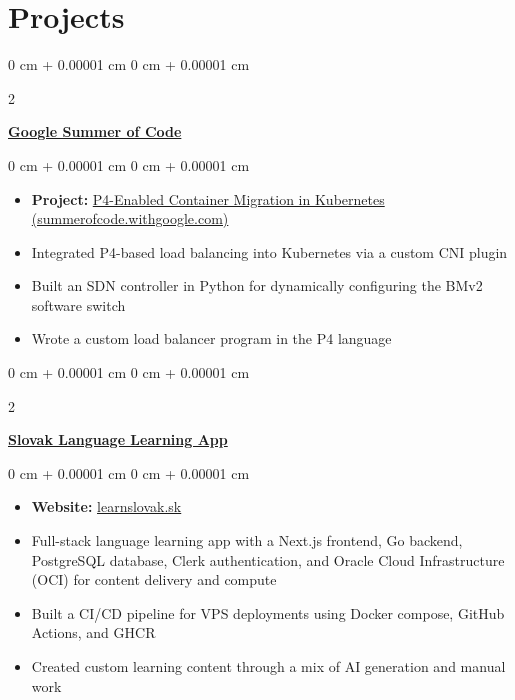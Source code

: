 \documentclass[10pt, letterpaper]{article}
\newenvironment{highlights}{
    \begin{itemize}[
        topsep=0.10 cm,
        parsep=0.10 cm,
        partopsep=0pt,
        itemsep=0pt,
        leftmargin=0 cm + 10pt
    ]
}{
    \end{itemize}
} %
\newenvironment{onecolentry}{
    \begin{adjustwidth}{
        0 cm + 0.00001 cm
    }{
        0 cm + 0.00001 cm
    }
}{
    \end{adjustwidth}
} %
\newenvironment{twocolentry}[2][]{
    \onecolentry
    \def\secondColumn{#2}
    \setcolumnwidth{\fill, 4.5 cm}
    \begin{paracol}{2}
}{
    \switchcolumn \raggedleft \secondColumn
    \end{paracol}
    \endonecolentry
} %
\begin{document}
    \section{Projects}

        \begin{twocolentry}{

        }
            \href{https://summerofcode.withgoogle.com/archive/2024/projects/sYbpOJhD}{\textbf{Google Summer of Code}}\end{twocolentry}

        \vspace{0.10 cm}
        \begin{onecolentry}
            \begin{highlights}
                \item \textbf{Project:} \href{https://summerofcode.withgoogle.com/archive/2024/projects/sYbpOJhD}{P4-Enabled Container Migration in Kubernetes (summerofcode.withgoogle.com)}
                \item Integrated P4-based load balancing into Kubernetes via a custom CNI plugin
                \item Built an SDN controller in Python for dynamically configuring the BMv2 software switch
                \item Wrote a custom load balancer program in the P4 language
            \end{highlights}
        \end{onecolentry}
        \vspace{0.2 cm}

        \begin{twocolentry}{

        }
            \href{https://learnslovak.sk}{\textbf{Slovak Language Learning App}}\end{twocolentry}

        \vspace{0.10 cm}
        \begin{onecolentry}
            \begin{highlights}
                \item \textbf{Website:} \href{https://learnslovak.sk}{learnslovak.sk}
                \item Full-stack language learning app with a Next.js frontend, Go backend, PostgreSQL database, Clerk authentication, and Oracle Cloud Infrastructure (OCI) for content delivery and compute
                \item Built a CI/CD pipeline for VPS deployments using Docker compose, GitHub Actions, and GHCR
                \item Created custom learning content through a mix of AI generation and manual work
            \end{highlights}
        \end{onecolentry}
\end{document}
